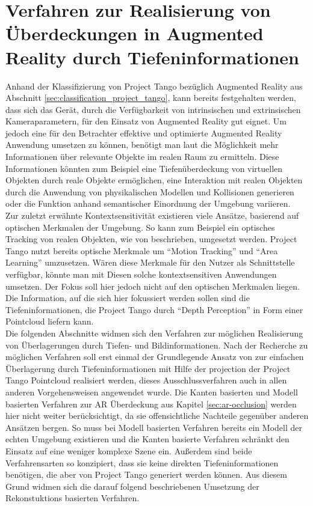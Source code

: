 \chapter{Verfahren zur Realisierung von Überdeckungen in Augmented Reality durch Tiefen\-informationen} \label{sec:optimization}

Anhand der Klassifizierung von Project Tango bezüglich Augmented Reality aus Abschnitt \ref{sec:classification_project_tango}, kann bereits festgehalten werden, dass sich das Gerät, durch die Verfügbarkeit von intrinsischen und extrinsischen Kameraparametern, für den Einsatz von Augmented Reality gut eignet. Um jedoch eine für den Betrachter effektive und optimierte Augmented Reality Anwendung umsetzen zu können, benötigt man laut \citet{azuma2001recent} die Möglichkeit mehr Informationen über relevante Objekte im realen Raum zu ermitteln. Diese Informationen könnten zum Beispiel eine Tiefenüberdeckung von virtuellen Objekten durch reale Objekte ermöglichen, eine Interaktion mit realen Objekten durch die Anwendung von physikalischen Modellen und Kollisionen generieren oder die Funktion anhand semantischer Einordnung der Umgebung variieren. \\

Zur zuletzt erwähnte Kontextsensitivität existieren viele Ansätze, basierend auf optischen Merkmalen der Umgebung. So kann zum Beispiel ein optisches Tracking von realen Objekten, wie von \citet{lee2008hybrid} beschrieben, umgesetzt werden. Project Tango nutzt bereits optische Merkmale um \enquote{Motion Tracking} und \enquote{Area Learning} umzusetzen. Wären diese Merkmale für den Nutzer als Schnittstelle verfügbar, könnte man mit Diesen solche kontextsensitiven Anwendungen umsetzen. Der Fokus soll hier jedoch nicht auf den optischen Merkmalen liegen. Die Information, auf die sich hier fokussiert werden sollen sind die Tiefeninformationen, die Project Tango durch \enquote{Depth Perception} in Form einer Pointcloud liefern kann.\\

Die folgenden Abschnitte widmen sich den Verfahren zur möglichen Realisierung von Überlagerungen durch Tiefen- und Bildinformationen. Nach der Recherche zu möglichen Verfahren soll erst einmal der Grundlegende Ansatz von \citet{wloka1995resolving} zur einfachen Überlagerung durch Tiefeninformationen mit Hilfe der projection der Project Tango Pointcloud realisiert werden, dieses Ausschlussverfahren auch in allen anderen Vorgehensweisen angewendet wurde. Die Kanten basierten und Modell basierten Verfahren zur AR Überdeckung aus Kapitel \ref{sec:ar-occlusion} werden hier nicht weiter berücksichtigt, da sie offensichtliche Nachteile gegenüber anderen Ansätzen bergen. So muss bei Modell basierten Verfahren bereits ein Modell der echten Umgebung existieren und die Kanten basierte Verfahren schränkt den Einsatz auf eine weniger komplexe Szene ein. Außerdem sind beide Verfahrensarten so konzipiert, dass sie keine direkten Tiefeninformationen benötigen, die aber von Project Tango generiert werden können. Aus diesem Grund widmen sich die darauf folgend beschriebenen Umsetzung der Rekonstuktions basierten Verfahren.\\

